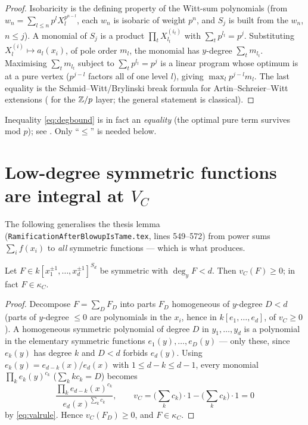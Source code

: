 \documentclass[11pt]{article}
\begin{document}
\begin{proof}
Isobaricity is the defining property of the Witt-sum polynomials (from
$w_n=\sum_{l\le n}p^l X_l^{p^{n-l}}$, each $w_n$ is isobaric of weight $p^n$, and
$S_j$ is built from the $w_n$, $n\le j$). A monomial of $S_j$ is a product
$\prod_t X^{(i_t)}_{l_t}$ with $\sum_t p^{l_t}=p^{j}$. Substituting
$X^{(i)}_l\mapsto a_l(x_i)$, of pole order $m_l$, the monomial has
$y$-degree $\sum_t m_{l_t}$. Maximising $\sum_t m_{l_t}$ subject to
$\sum_t p^{l_t}=p^{j}$ is a linear program whose optimum is at a pure vertex
($p^{j-l}$ factors all of one level $l$), giving $\max_l p^{j-l}m_l$. The last
equality is the Schmid--Witt/Brylinski break formula for Artin--Schreier--Witt
extensions (\cite{Thomas2005} for the $\mathbb{Z}/p$ layer; the general statement is
classical).
\end{proof}

\begin{rem*}
Inequality \cref{eq:degbound} is in fact an \emph{equality} (the optimal pure
term survives mod $p$); see . Only ``$\le$'' is needed below.
\end{rem*}

\section{Low-degree symmetric functions are integral at \texorpdfstring{$V_C$}{V_C}}
\label{sec:integral}

The following generalises the thesis lemma
(\texttt{RamificationAfterBlowupIsTame.tex}, lines 549--572) from power sums
$\sum_i f(x_i)$ to \emph{all} symmetric functions --- which is what
 produces.

\begin{lemma}[integrality]\label{lem:integral}
Let $F\in k[x_1^{\pm1},\dots,x_d^{\pm1}]^{S_d}$ be symmetric with
$\deg_y F<d$. Then $v_C(F)\ge0$; in fact $F\in\kappa_C$.
\end{lemma}

\begin{proof}
Decompose $F=\sum_{D}F_D$ into parts $F_D$ homogeneous of $y$-degree $D<d$
(parts of $y$-degree $\le0$ are polynomials in the $x_i$, hence in
$k[e_1,\dots,e_d]$, of $v_C\ge0$). A homogeneous symmetric polynomial of degree
$D$ in $y_1,\dots,y_d$ is a polynomial in the elementary symmetric functions
$e_1(y),\dots,e_D(y)$ --- only these, since $e_k(y)$ has degree $k$ and $D<d$
forbids $e_d(y)$. Using $e_k(y)=e_{d-k}(x)/e_d(x)$ with $1\le d-k\le d-1$, every
monomial $\prod_k e_k(y)^{c_k}$ ($\sum_k kc_k=D$) becomes
\[
\frac{\prod_k e_{d-k}(x)^{c_k}}{e_d(x)^{\sum_k c_k}},\qquad
v_C=\Big(\textstyle\sum_k c_k\Big)\cdot1-\Big(\textstyle\sum_k c_k\Big)\cdot1=0
\]
by \cref{eq:valrule}. Hence $v_C(F_D)\ge0$, and $F\in\kappa_C$.
\end{proof}
\end{document}
